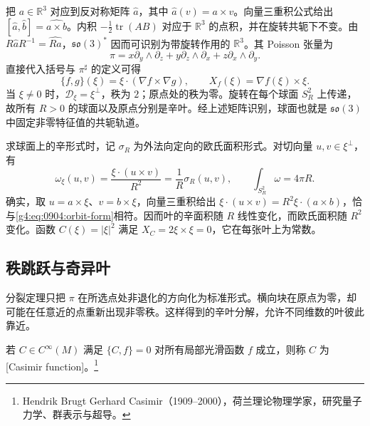 \begin{example}\label{g4:exm:0904:so3}
	把 \(a\in\mathbb R^3\) 对应到反对称矩阵 \(\widehat a\)，其中 \(\widehat a(v)=a\times v\)。向量三重积公式给出 \([\widehat a,\widehat b]=\widehat{a\times b}\)。内积 \(-\frac12\operatorname{tr}(AB)\) 对应于 \(\mathbb R^3\) 的点积，并在旋转共轭下不变。由 \(R\widehat aR^{-1}=\widehat{Ra}\)，\(\mathfrak{so}(3)^*\) 因而可识别为带旋转作用的 \(\mathbb R^3\)。其 Poisson 张量为
	\begin{equation}\label{g4:eq:0904:so3-tensor}
		\pi=x\partial_y\wedge\partial_z
		+y\partial_z\wedge\partial_x
		+z\partial_x\wedge\partial_y.
	\end{equation}
	直接代入括号与 \(\pi^\sharp\) 的定义可得
	\[
		\{f,g\}(\xi)=\xi\cdot(\nabla f\times\nabla g),
		\qquad X_f(\xi)=\nabla f(\xi)\times\xi.
	\]
	当 \(\xi\neq0\) 时，\(\mathcal D_\xi=\xi^\perp\)，秩为 \(2\)；原点处的秩为零。旋转在每个球面 \(S_R^2\) 上传递，故所有 \(R>0\) 的球面以及原点分别是辛叶。经上述矩阵识别，球面也就是 \(\mathfrak{so}(3)\) 中固定非零特征值的共轭轨道。

	求球面上的辛形式时，记 \(\sigma_R\) 为外法向定向的欧氏面积形式。对切向量 \(u,v\in\xi^\perp\)，有
	\begin{equation}\label{g4:eq:0904:so3-sphere-form}
		\omega_\xi(u,v)=\frac{\xi\cdot(u\times v)}{R^2}
		=\frac1R\sigma_R(u,v),
		\qquad \int_{S_R^2}\omega=4\pi R.
	\end{equation}
	确实，取 \(u=a\times\xi\)、\(v=b\times\xi\)，向量三重积给出 \(\xi\cdot(u\times v)=R^2\xi\cdot(a\times b)\)，恰与\eqref{g4:eq:0904:orbit-form}相符。因而叶的辛面积随 \(R\) 线性变化，而欧氏面积随 \(R^2\) 变化。函数 \(C(\xi)=|\xi|^2\) 满足 \(X_C=2\xi\times\xi=0\)，它在每张叶上为常数。
\end{example}

\subsection{秩跳跃与奇异叶}
\label{g4:subsec:0904:04}
分裂定理只把 \(\pi\) 在所选点处非退化的方向化为标准形式。横向块在原点为零，却可能在任意近的点重新出现非零秩。这样得到的辛叶分解，允许不同维数的叶彼此靠近。

\begin{definition}\label{g4:def:0904:casimir}
	若 \(C\in C^\infty(M)\) 满足 \(\{C,f\}=0\) 对所有局部光滑函数 \(f\) 成立，则称 \(C\) 为[Casimir function]。\footnote{Hendrik Brugt Gerhard Casimir（1909--2000），荷兰理论物理学家，研究量子力学、群表示与超导。}
\end{definition}

